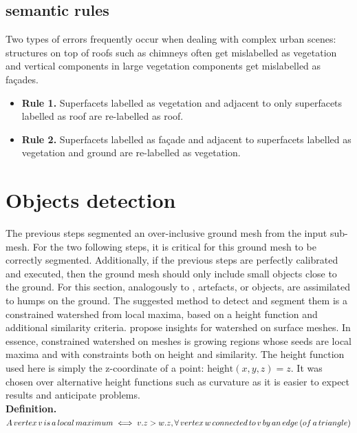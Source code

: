 \documentclass{kththesis}
\begin{document}
\subsection{\textcite{verdie} semantic rules }
Two types of errors frequently
occur when dealing with complex urban scenes: structures on top of roofs such as chimneys often get mislabelled as vegetation and vertical components in large vegetation components get mislabelled as façades. 
\begin{itemize}
    \item \textbf{Rule 1.} Superfacets labelled as vegetation and adjacent to only superfacets labelled as roof are re-labelled as roof. 
    \item \textbf{Rule 2.} Superfacets labelled as façade and adjacent to superfacets labelled as vegetation and ground are re-labelled as vegetation.
\end{itemize}
\section{Objects detection}
\label{sec:objectdetec}
The previous steps segmented an over-inclusive ground mesh from the input sub-mesh. For the two following steps, it is critical for this ground mesh to be correctly segmented. Additionally, if the previous steps are perfectly calibrated and executed, then the ground mesh should only include small objects close to the ground. 
For this section, analogously to \textcite{HernandezArtefacts}, artefacts, or objects, are assimilated to humps on the ground. The suggested method to detect and segment them is a constrained watershed from local maxima, based on a height function and additional similarity criteria. \textcite{ManganMeshWatershed} propose insights for watershed on surface meshes. In essence,  constrained watershed on meshes is growing regions whose seeds  are local maxima and with constraints both on height and similarity. The height function used here is simply the z-coordinate of a point: $\text{height}(x,y,z) = z$. It was chosen over alternative height functions such as curvature as it is easier to expect results and anticipate problems.   \\

\textbf{Definition. }$ A \, vertex\, v\, is\, a\, local \,maximum \\\iff v.z > w.z, \forall \, vertex\, w \,connected \,to\, v \,by \,an\, edge \,(of \,a\,triangle)$ \\
\end{document}
